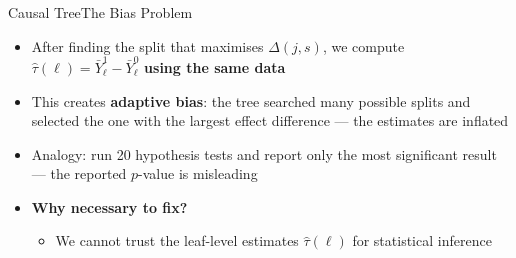\documentclass[dvipsnames,hyperref={pdfpagelabels=false}]{beamer}
\begin{document}
\begin{frame}{Causal Tree}{The Bias Problem}
\begin{itemize}
	\item After finding the split that maximises $\Delta(j,s)$, we compute $\hat{\tau}(\ell) = \bar{Y}^1_\ell - \bar{Y}^0_\ell$ \textbf{using the same data}
	\vspace{0.2cm}
	\item This creates \textbf{adaptive bias}: the tree searched many possible splits and selected the one with the largest effect difference --- the estimates are inflated
	\vspace{0.2cm}
	\item Analogy: run 20 hypothesis tests and report only the most significant result --- the reported $p$-value is misleading
	\vspace{0.2cm}
	\item \textbf{Why necessary to fix?}
	\vspace{0.1cm}
	\begin{itemize}
		\item We cannot trust the leaf-level estimates $\hat{\tau}(\ell)$ for statistical inference
	\end{itemize}
\end{itemize}
\vspace{0.2cm}
\begin{center}
\end{center}
\end{frame}
\end{document}
